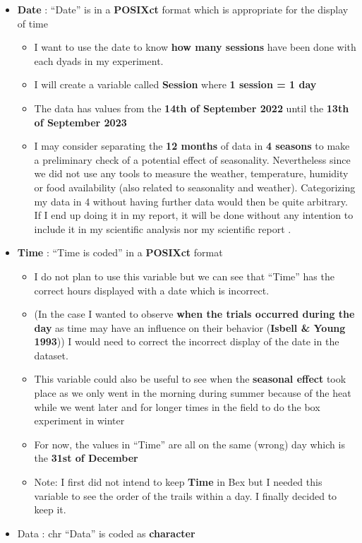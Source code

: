 \documentclass[
]{article}
\providecommand{\tightlist}{%
  \setlength{\itemsep}{0pt}\setlength{\parskip}{0pt}}
\begin{document}
\begin{itemize}
\item
  \textbf{Date} : ``Date'' is in a \textbf{POSIXct} format which is
  appropriate for the display of time

  \begin{itemize}
  \tightlist
  \item
    I want to use the date to know \textbf{how many sessions} have been
    done with each dyads in my experiment.
  \item
    I will create a variable called \textbf{Session} where \textbf{1
    session = 1 day}
  \item
    The data has values from the \textbf{14th of September 2022} until
    the \textbf{13th of September 2023}
  \item
    I may consider separating the \textbf{12 months} of data in
    \textbf{4 seasons} to make a preliminary check of a potential effect
    of seasonality. Nevertheless since we did not use any tools to
    measure the weather, temperature, humidity or food availability
    (also related to seasonality and weather). Categorizing my data in 4
    without having further data would then be quite arbitrary. If I end
    up doing it in my report, it will be done without any intention to
    include it in my scientific analysis nor my scientific report .
  \end{itemize}
\item
  \textbf{Time} : ``Time is coded'' in a \textbf{POSIXct} format

  \begin{itemize}
  \tightlist
  \item
    I do not plan to use this variable but we can see that ``Time'' has
    the correct hours displayed with a date which is incorrect.
  \item
    (In the case I wanted to observe \textbf{when the trials occurred
    during the day} as time may have an influence on their behavior
    (\textbf{Isbell \& Young 1993})) I would need to correct the
    incorrect display of the date in the dataset.
  \item
    This variable could also be useful to see when the \textbf{seasonal
    effect} took place as we only went in the morning during summer
    because of the heat while we went later and for longer times in the
    field to do the box experiment in winter
  \item
    For now, the values in ``Time'' are all on the same (wrong) day
    which is the \textbf{31st of December}
  \item
    Note: I first did not intend to keep \textbf{Time} in Bex but I
    needed this variable to see the order of the trails within a day. I
    finally decided to keep it.
  \end{itemize}
\item
  Data : chr ``Data'' is coded as \textbf{character}


\end{itemize}
\end{document}
